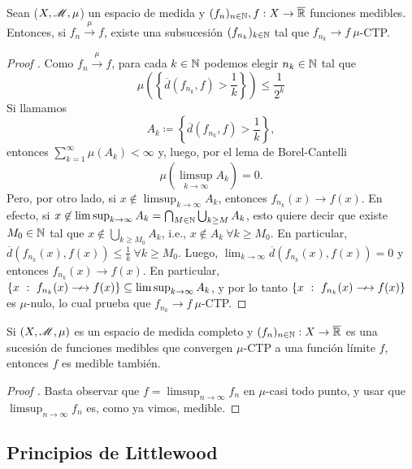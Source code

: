 \begin{prop}
	Sean ($X, \mathscr{M}, \mu$) un espacio de medida y $(f_n)_{n\in\mathbb{N}}, f : X \to \overline{\mathbb{R}}$ funciones medibles. Entonces, si $f_n \stackrel{\mu}{\longrightarrow} f$, existe una subsucesión $(f_{n_k})_{k\in\mathbb{N}}$ tal que $f_{n_k} \longrightarrow f \ \mu$-CTP.
\end{prop}
\begin{proof}[Proof ]
	Como $f_n \stackrel{\mu}{\longrightarrow} f$, para cada $k \in \mathbb{N}$ podemos elegir $n_k \in \mathbb{N}$ tal que
	\[ \mu \left(\left\{\overline{d}(f_{n_k}, f) > \frac{1}{k}\right\}\right) \leq \frac{1}{2^k}\]
	Si llamamos 
	\[ A_k \coloneq \left\{\overline{d}(f_{n_k}, f) > \frac{1}{k}\right\}, \]
	entonces $\sum_{k=1}^{\infty} \mu(A_k) < \infty$ y, luego, por el lema de Borel-Cantelli
	\[ \mu(\limsup_{k \to \infty} A_k) = 0. \]
	Pero, por otro lado, si $x \not\in \limsup_{k \to \infty} A_k$, entonces $f_{n_k}(x) \longrightarrow f(x)$. En efecto, si $x \not\in \limsup_{k \to \infty} A_k = \bigcap_{M\in\mathbb{N}} \bigcup_{k \geq M} A_k$, esto quiere decir que existe $M_0 \in \mathbb{N}$ tal que $x \not\in \bigcup_{k \geq M_0} A_k$, i.e., $x \not\in A_k \ \forall k \geq M_{0}$. En particular, $\overline{d}(f_{n_k}(x), f(x)) \leq \frac{1}{k} \ \forall k \geq M_{0}$. Luego, $\lim_{k \to \infty} \overline{d}(f_{n_k}(x), f(x)) = 0$ y entonces $f_{n_k}(x) \longrightarrow f(x)$. En particular, $\{x \ : \ f_{n_k}(x) \longarrownot\longrightarrow f(x)\} \subseteq \limsup_{k \to \infty} A_k$, y por lo tanto $\{x \ : \ f_{n_k}(x) \longarrownot\longrightarrow f(x)\}$ es $\mu$-nulo, lo cual prueba que $f_{n_k} \longrightarrow f \ \mu$-CTP.
\end{proof}

\begin{corollary}
	Si $(X, \mathscr{M}, \mu)$ es un espacio de medida completo y $(f_n)_{n\in\mathbb{N}} : X \to \overline{\mathbb{R}}$ es una sucesión de funciones medibles que convergen $\mu$-CTP a una función límite $f$, entonces $f$ es medible también.
\end{corollary}
\begin{proof}[Proof ]
	Basta observar que $f = \limsup_{n \to \infty} f_n$ en $\mu$-casi todo punto, y usar que $\limsup_{n \to \infty} f_n$ es, como ya vimos, medible.
\end{proof}

\subsection{Principios de Littlewood}

